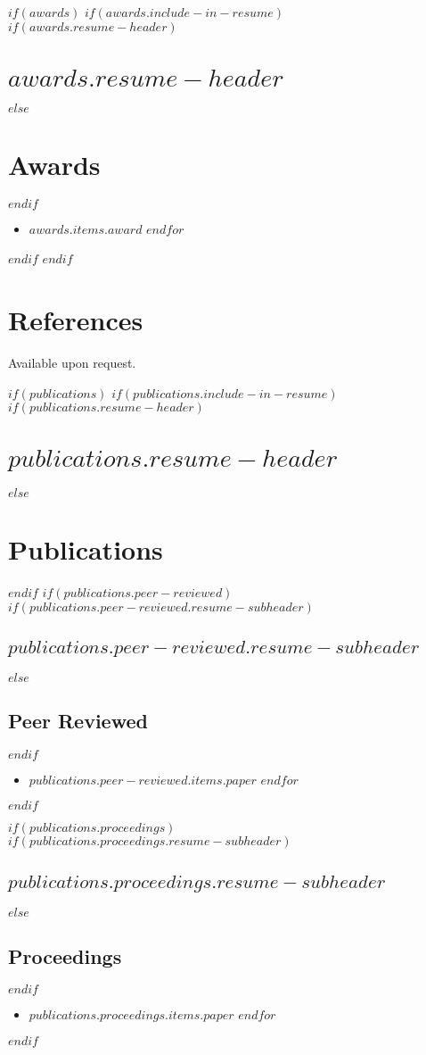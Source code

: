 \documentclass[letterpaper,10pt,final]{moderncv}
\begin{document}
$if(awards)$
$if(awards.include-in-resume)$
$if(awards.resume-header)$
\section{$awards.resume-header$}
$else$
\section{Awards}
$endif$
\small
\begin{itemize}
$for(awards.items)$
\item $awards.items.award$
$endfor$
\end{itemize}
$endif$
$endif$

\section{References}
Available upon request.

$if(publications)$
$if(publications.include-in-resume)$
$if(publications.resume-header)$
\section{$publications.resume-header$}
$else$
\section{Publications}
$endif$
$if(publications.peer-reviewed)$
$if(publications.peer-reviewed.resume-subheader)$
\subsection{$publications.peer-reviewed.resume-subheader$}
$else$
\subsection{Peer Reviewed}
$endif$
\begin{itemize}
$for(publications.peer-reviewed.items)$
\item $publications.peer-reviewed.items.paper$
$endfor$
\end{itemize}
$endif$

$if(publications.proceedings)$
$if(publications.proceedings.resume-subheader)$
\subsection{$publications.proceedings.resume-subheader$}
$else$
\subsection{Proceedings}
$endif$
\begin{itemize}
$for(publications.proceedings.items)$
\item $publications.proceedings.items.paper$
$endfor$
\end{itemize}
$endif$
\end{document}
